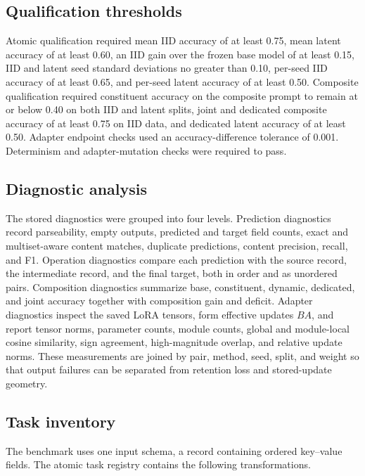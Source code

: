\documentclass[10pt,twocolumn]{article}
\begin{document}
\subsection{Qualification thresholds}

Atomic qualification required mean IID accuracy of at least 0.75, mean latent accuracy of at least 0.60, an IID gain over the frozen base model of at least 0.15, IID and latent seed standard deviations no greater than 0.10, per-seed IID accuracy of at least 0.65, and per-seed latent accuracy of at least 0.50. Composite qualification required constituent accuracy on the composite prompt to remain at or below 0.40 on both IID and latent splits, joint and dedicated composite accuracy of at least 0.75 on IID data, and dedicated latent accuracy of at least 0.50. Adapter endpoint checks used an accuracy-difference tolerance of 0.001. Determinism and adapter-mutation checks were required to pass.

\subsection{Diagnostic analysis}

The stored diagnostics were grouped into four levels. Prediction diagnostics record parseability, empty outputs, predicted and target field counts, exact and multiset-aware content matches, duplicate predictions, content precision, recall, and F1. Operation diagnostics compare each prediction with the source record, the intermediate record, and the final target, both in order and as unordered pairs. Composition diagnostics summarize base, constituent, dynamic, dedicated, and joint accuracy together with composition gain and deficit. Adapter diagnostics inspect the saved LoRA tensors, form effective updates $B A$, and report tensor norms, parameter counts, module counts, global and module-local cosine similarity, sign agreement, high-magnitude overlap, and relative update norms. These measurements are joined by pair, method, seed, split, and weight so that output failures can be separated from retention loss and stored-update geometry.

\subsection{Task inventory}

The benchmark uses one input schema, a record containing ordered key--value fields. The atomic task registry contains the following transformations.
\end{document}
